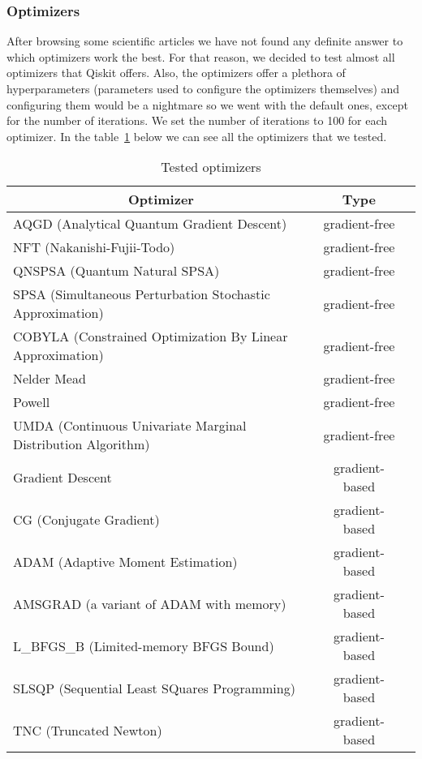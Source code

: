 \subsubsection{Optimizers}
After browsing some scientific articles we have not found any definite answer to which optimizers work the best. For that reason, we decided to test almost all optimizers that Qiskit offers.  Also, the optimizers offer a plethora of hyperparameters (parameters used to configure the optimizers themselves) and configuring them would be a nightmare so we went with the default ones, except for the number of iterations. We set the number of iterations to 100 for each optimizer. In the table~\ref{tab:optimizers} below we can see all the optimizers that we tested.

\begin{table}
    \centering
    \caption{Tested optimizers}
    \begin{tabular}{|l|c|c|} 
        \hline
        \multicolumn{1}{|c|}{\textbf{Optimizer}} & \textbf{Type}\\
        \hline
        AQGD (Analytical Quantum Gradient Descent) & gradient-free \\ 
        \hline
        NFT (Nakanishi-Fujii-Todo) & gradient-free \\ 
        \hline
        QNSPSA (Quantum Natural SPSA) & gradient-free \\ 
        \hline
        SPSA (Simultaneous Perturbation Stochastic Approximation) & gradient-free \\ 
        \hline
        COBYLA (Constrained Optimization By Linear Approximation) & gradient-free \\ 
        \hline
        Nelder Mead & gradient-free \\ 
        \hline
        Powell & gradient-free \\ 
        \hline
        UMDA (Continuous Univariate Marginal Distribution Algorithm) & gradient-free \\ 
        \hline
        Gradient Descent & gradient-based \\ 
        \hline
        CG (Conjugate Gradient) & gradient-based \\ 
        \hline
        ADAM (Adaptive Moment Estimation) & gradient-based \\ 
        \hline
        AMSGRAD (a variant of ADAM with memory) & gradient-based \\ 
        \hline
        L\_BFGS\_B (Limited-memory BFGS Bound)  & gradient-based \\ 
        \hline
        SLSQP (Sequential Least SQuares Programming)  & gradient-based \\ 
        \hline
        TNC (Truncated Newton)  & gradient-based \\ 
        \hline
    \end{tabular}
    \label{tab:optimizers}
\end{table}
